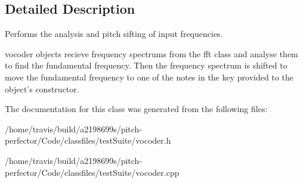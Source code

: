 \subsection{Detailed Description}
Performs the analysis and pitch sifting of input frequencies. 

vocoder objects recieve frequency spectrums from the fft class and analyse them to find the fundamental frequency. Then the frequency spectrum is shifted to move the fundamental frequency to one of the notes in the key provided to the object's constructor. 

The documentation for this class was generated from the following files\-:\begin{DoxyCompactItemize}
\item 
/home/travis/build/a2198699s/pitch-\/perfector/\-Code/classfiles/test\-Suite/vocoder.\-h\item 
/home/travis/build/a2198699s/pitch-\/perfector/\-Code/classfiles/test\-Suite/vocoder.\-cpp\end{DoxyCompactItemize}
